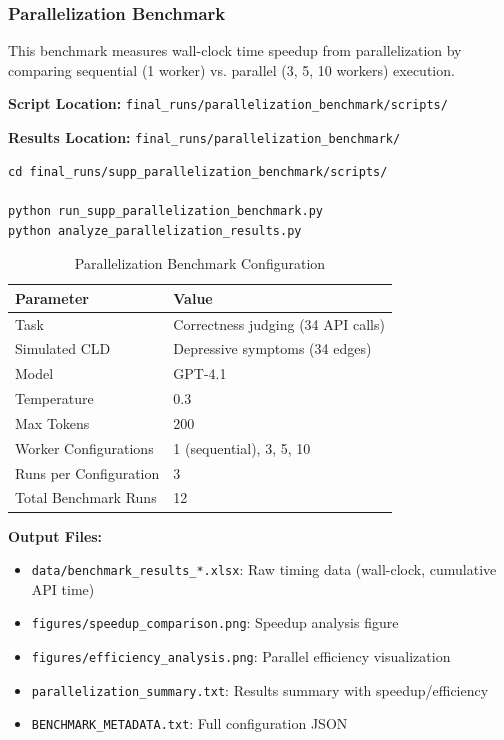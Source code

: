 \subsubsection{Parallelization Benchmark}

This benchmark measures wall-clock time speedup from parallelization by comparing sequential (1 worker) vs. parallel (3, 5, 10 workers) execution.

\textbf{Script Location:} \texttt{final\_runs/parallelization\_benchmark/scripts/}

\textbf{Results Location:} \texttt{final\_runs/parallelization\_benchmark/}

\begin{verbatim}
cd final_runs/supp_parallelization_benchmark/scripts/

python run_supp_parallelization_benchmark.py
python analyze_parallelization_results.py
\end{verbatim}

\begin{table}[H]
\centering
\caption{Parallelization Benchmark Configuration}
\label{tab:parallel_benchmark_config}
\footnotesize
\begin{tabular}{@{}ll@{}}
\toprule
\textbf{Parameter} & \textbf{Value} \\
\midrule
Task & Correctness judging (34 API calls) \\
Simulated CLD & Depressive symptoms (34 edges) \\
Model & GPT-4.1 \\
Temperature & 0.3 \\
Max Tokens & 200 \\
Worker Configurations & 1 (sequential), 3, 5, 10 \\
Runs per Configuration & 3 \\
Total Benchmark Runs & 12 \\
\bottomrule
\end{tabular}
\end{table}

\textbf{Output Files:}
\begin{itemize}[noitemsep]
    \item \texttt{data/benchmark\_results\_*.xlsx}: Raw timing data (wall-clock, cumulative API time)
    \item \texttt{figures/speedup\_comparison.png}: Speedup analysis figure
    \item \texttt{figures/efficiency\_analysis.png}: Parallel efficiency visualization
    \item \texttt{parallelization\_summary.txt}: Results summary with speedup/efficiency
    \item \texttt{BENCHMARK\_METADATA.txt}: Full configuration JSON
\end{itemize}


